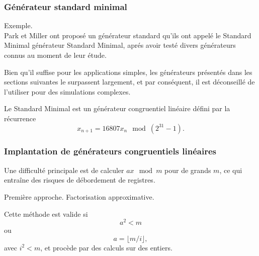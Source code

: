 \documentclass[t,usepdftitle=false]{beamer}
\begin{document}

\begin{frame}
\frametitle{Générateur standard minimal}

Exemple.\\
Park et Miller ont proposé un générateur standard qu'ils ont appelé le Standard
Minimal générateur Standard Minimal, aprés avoir testé divers générateurs connus au moment de leur étude.

\mbox{}

Bien qu'il suffise pour les applications simples,
les générateurs présentés dans les sections suivantes le surpassent
largement, et par conséquent, il est déconseillé de l'utiliser pour
des simulations complexes.

\mbox{}

Le Standard Minimal est un générateur congruentiel linéaire défini par
la récurrence
\[
  x_{n+1} = 16807x_n\mod (2^{31}- 1).
\]
\end{frame}

\begin{frame}
\frametitle{Implantation de générateurs congruentiels linéaires}

Une difficulté principale est de calculer $ax \mod m$ pour de grands $m$, ce qui entraîne des risques de débordement de registres.

\mbox{}

Première approche. Factorisation approximative.

\mbox{}

Cette méthode est valide si
\[
a^2 < m
\]
ou
\[
a = \lfloor m/i \rfloor,
\]
avec $i^2 < m$, et procède par des calculs sur des entiers.
\end{frame}
\end{document}
